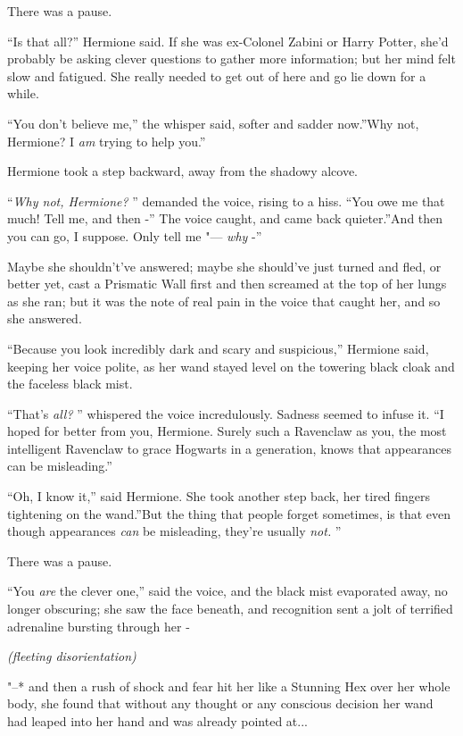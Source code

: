 There was a pause.

``Is that all?'' Hermione said. If she was ex-Colonel Zabini or Harry
Potter, she'd probably be asking clever questions to gather more
information; but her mind felt slow and fatigued. She really needed to
get out of here and go lie down for a while.

``You don't believe me,'' the whisper said, softer and sadder now.''Why
not, Hermione? I \emph{am} trying to help you.''

Hermione took a step backward, away from the shadowy alcove.

``\emph{Why not, Hermione?} '' demanded the voice, rising to a hiss. ``You
owe me that much! Tell me, and then -'' The voice caught, and came back
quieter.''And then you can go, I suppose. Only tell me "--- \emph{why} -''

Maybe she shouldn't've answered; maybe she should've just turned and
fled, or better yet, cast a Prismatic Wall first and then screamed at
the top of her lungs as she ran; but it was the note of real pain in the
voice that caught her, and so she answered.

``Because you look incredibly dark and scary and suspicious,'' Hermione
said, keeping her voice polite, as her wand stayed level on the towering
black cloak and the faceless black mist.

``That's \emph{all?} '' whispered the voice incredulously. Sadness seemed
to infuse it. ``I hoped for better from you, Hermione. Surely such a
Ravenclaw as you, the most intelligent Ravenclaw to grace Hogwarts in a
generation, knows that appearances can be misleading.''

``Oh, I know it,'' said Hermione. She took another step back, her tired
fingers tightening on the wand.''But the thing that people forget
sometimes, is that even though appearances \emph{can} be misleading,
they're usually \emph{not.} ''

There was a pause.

``You \emph{are} the clever one,'' said the voice, and the black mist
evaporated away, no longer obscuring; she saw the face beneath, and
recognition sent a jolt of terrified adrenaline bursting through her -

\emph{(fleeting disorientation)}

"--* and then a rush of shock and fear hit her like a Stunning Hex over her
whole body, she found that without any thought or any conscious decision
her wand had leaped into her hand and was already pointed at...


